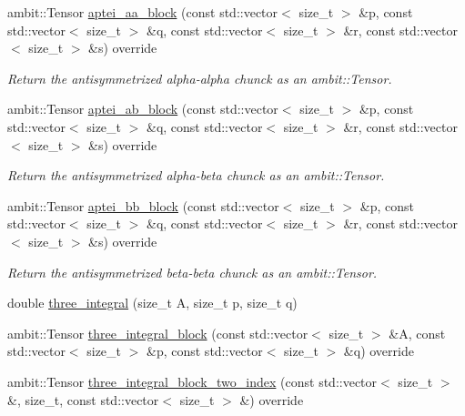 \begin{DoxyCompactItemize}
ambit\+::\+Tensor \mbox{\hyperlink{classforte_1_1_d_f_integrals_a2dc1ace8715b3c5a9b7c9da4afbeee44}{aptei\+\_\+aa\+\_\+block}} (const std\+::vector$<$ size\+\_\+t $>$ \&p, const std\+::vector$<$ size\+\_\+t $>$ \&q, const std\+::vector$<$ size\+\_\+t $>$ \&r, const std\+::vector$<$ size\+\_\+t $>$ \&s) override
\begin{DoxyCompactList}\small\item\em Return the antisymmetrized alpha-\/alpha chunck as an ambit\+::\+Tensor. \end{DoxyCompactList}\item 
ambit\+::\+Tensor \mbox{\hyperlink{classforte_1_1_d_f_integrals_a0c7391787d43e90df9a343a59bcadfbc}{aptei\+\_\+ab\+\_\+block}} (const std\+::vector$<$ size\+\_\+t $>$ \&p, const std\+::vector$<$ size\+\_\+t $>$ \&q, const std\+::vector$<$ size\+\_\+t $>$ \&r, const std\+::vector$<$ size\+\_\+t $>$ \&s) override
\begin{DoxyCompactList}\small\item\em Return the antisymmetrized alpha-\/beta chunck as an ambit\+::\+Tensor. \end{DoxyCompactList}\item 
ambit\+::\+Tensor \mbox{\hyperlink{classforte_1_1_d_f_integrals_a1eb5b7a379b668d0b10a0871a934b2cd}{aptei\+\_\+bb\+\_\+block}} (const std\+::vector$<$ size\+\_\+t $>$ \&p, const std\+::vector$<$ size\+\_\+t $>$ \&q, const std\+::vector$<$ size\+\_\+t $>$ \&r, const std\+::vector$<$ size\+\_\+t $>$ \&s) override
\begin{DoxyCompactList}\small\item\em Return the antisymmetrized beta-\/beta chunck as an ambit\+::\+Tensor. \end{DoxyCompactList}\item 
double \mbox{\hyperlink{classforte_1_1_d_f_integrals_a3d33d2d8107f1066c08f62e62ba51c8a}{three\+\_\+integral}} (size\+\_\+t A, size\+\_\+t p, size\+\_\+t q)
\item 
ambit\+::\+Tensor \mbox{\hyperlink{classforte_1_1_d_f_integrals_a830361fd7e2efd8c8d22fd5abcacfad1}{three\+\_\+integral\+\_\+block}} (const std\+::vector$<$ size\+\_\+t $>$ \&A, const std\+::vector$<$ size\+\_\+t $>$ \&p, const std\+::vector$<$ size\+\_\+t $>$ \&q) override
\item 
ambit\+::\+Tensor \mbox{\hyperlink{classforte_1_1_d_f_integrals_a455cc314d177bbcd4c25cbca6b0f02be}{three\+\_\+integral\+\_\+block\+\_\+two\+\_\+index}} (const std\+::vector$<$ size\+\_\+t $>$ \&, size\+\_\+t, const std\+::vector$<$ size\+\_\+t $>$ \&) override

\end{DoxyCompactItemize}
